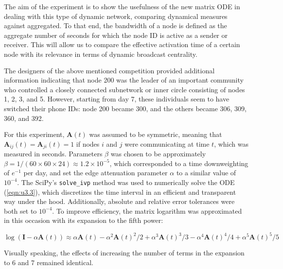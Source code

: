 The aim of the experiment is to show the usefulness of the new matrix ODE in dealing with this type of dynamic network, comparing dynamical measures against aggregated. To that end, the bandwidth of a node is defined as the aggregate number of seconds for which the node ID is active as a sender or receiver. This will allow us to compare the effective activation time of a certain node with its relevance in terms of dynamic broadcast centrality.


The designers of the above mentioned competition provided additional information indicating that node 200 was the leader of an important community who controlled a closely connected subnetwork or inner circle consisting of nodes 1, 2, 3, and 5. However, starting from day 7, these individuals seem to have switched their phone IDs: node 200 became 300, and the others became 306, 309, 360, and 392.

For this experiment, $\mathbf{A}(t)$ was assumed to be symmetric, meaning that $\mathbf{A}_{ij}(t) = \mathbf{A}_{ji}(t) = 1$ if nodes $i$ and $j$ were communicating at time $t$, which was measured in seconds. Parameters $\beta$ was chosen to be approximately $\beta = 1/(60\times 60 \times 24) \approx 1.2 \times 10^{-5}$, which corresponded to a time downweighting of $e^{-1}$ per day, and set the edge attenuation parameter $\alpha$ to a similar value of $10^{-4}$. The SciPy's \texttt{solve\_ivp} method was used to numerically solve the ODE (\ref{eqn:u3.3}), which discretizes the time interval in an efficient and transparent way under the hood. Additionally, absolute and relative error tolerances were both set to $10^{-4}$. To improve efficiency, the matrix logarithm was approximated in this occasion with its expansion to the fifth power:

$$\log(\mathbf{I} - \alpha \mathbf{A}(t)) \approx \alpha \mathbf{A}(t) - \alpha^2 \mathbf{A}(t)^2/2 + \alpha^3 \mathbf{A}(t)^3/3 - \alpha^4 \mathbf{A}(t)^4/4 + \alpha^5 \mathbf{A}(t)^5/5$$ 

Visually speaking, the effects of increasing the number of terms in the expansion to 6 and 7 remained identical.



